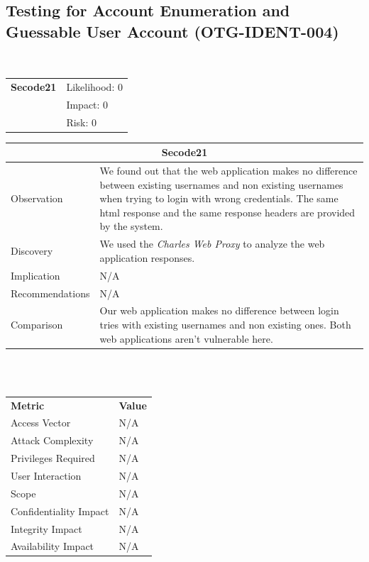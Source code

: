 \documentclass[headsepline,footsepline,footinclude=false,oneside,fontsize=11pt,paper=a4,listof=totoc,bibliography=totoc]{scrbook} %
\begin{document}
\subsection{Testing for Account Enumeration and Guessable User Account (OTG-IDENT-004)}\
\begin{tabular}{cR{12cm}}
	\textbf{Secode21} & Likelihood: 0\\& Impact: 0\\& Risk: 0
\end{tabular}

\begin{tabular}{ l|p{11cm}  }
	\hline
	\multicolumn{2}{c}{\textbf{Secode21}} \\
	\hline
	Observation   & We found out that the web application makes no difference between existing usernames and non existing usernames when trying to login with wrong credentials. The same html response and the same response headers are provided by the system. \\
	Discovery  & We used the \textit{Charles Web Proxy} to analyze the web application responses. \\
	Implication    & N/A \\
	Recommendations & N/A \\
	Comparison & Our web application makes no difference between login tries with existing usernames and non existing ones. Both web applications aren't vulnerable here. \\
	\hline
\end{tabular}
\\
\vspace{0.5cm}
\\
\begin{center}
	\begin{tabular}{ll}
		\rowcolor[HTML]{34CDF9}
		{\color[HTML]{ECF4FF} \textbf{Metric}}        & {\color[HTML]{ECF4FF} \textbf{Value}} \\
		\rowcolor[HTML]{BBDAFF}
		{\color[HTML]{333333} Access Vector}          & {\color[HTML]{333333} } N/A              \\
		\rowcolor[HTML]{ECF4FF}
		{\color[HTML]{333333} Attack Complexity}      & {\color[HTML]{333333} } N/A              \\
		\rowcolor[HTML]{BBDAFF}
		{\color[HTML]{333333} Privileges Required}    & {\color[HTML]{333333} } N/A              \\
		\rowcolor[HTML]{ECF4FF}
		{\color[HTML]{333333} User Interaction}       & {\color[HTML]{333333} } N/A              \\
		\rowcolor[HTML]{BBDAFF}
		{\color[HTML]{333333} Scope}                  & {\color[HTML]{333333} } N/A              \\
		\rowcolor[HTML]{ECF4FF}
		{\color[HTML]{333333} Confidentiality Impact} & {\color[HTML]{333333} } N/A              \\
		\rowcolor[HTML]{BBDAFF}
		{\color[HTML]{333333} Integrity Impact}       & {\color[HTML]{333333} } N/A              \\
		\rowcolor[HTML]{ECF4FF}
		{\color[HTML]{333333} Availability Impact}    & {\color[HTML]{333333} } N/A
	\end{tabular}
\end{center}
\pagebreak
\end{document}
